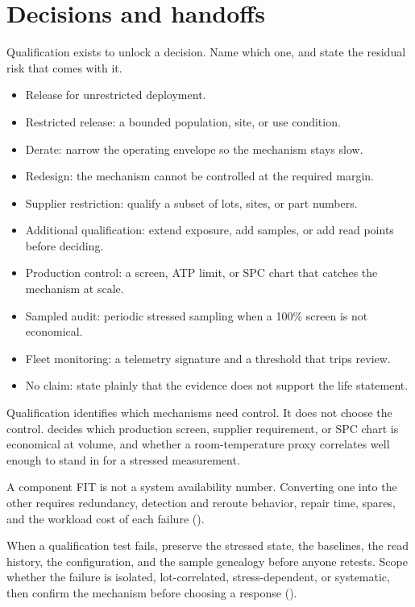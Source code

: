 \section{Decisions and handoffs}
\label{sec:qual-handoffs}

Qualification exists to unlock a decision. Name which one, and state the
residual risk that comes with it.

\begin{itemize}
\item Release for unrestricted deployment.
\item Restricted release: a bounded population, site, or use condition.
\item Derate: narrow the operating envelope so the mechanism stays slow.
\item Redesign: the mechanism cannot be controlled at the required margin.
\item Supplier restriction: qualify a subset of lots, sites, or part numbers.
\item Additional qualification: extend exposure, add samples, or add read
      points before deciding.
\item Production control: a screen, ATP limit, or SPC chart that catches the
      mechanism at scale.
\item Sampled audit: periodic stressed sampling when a 100\% screen is not
      economical.
\item Fleet monitoring: a telemetry signature and a threshold that trips
      review.
\item No claim: state plainly that the evidence does not support the life
      statement.
\end{itemize}

Qualification identifies which mechanisms need control. It does not choose the
control.  decides which production screen, supplier
requirement, or SPC chart is economical at volume, and whether a
room-temperature proxy correlates well enough to stand in for a stressed
measurement.

A component FIT is not a system availability number. Converting one into the
other requires redundancy, detection and reroute behavior, repair time, spares,
and the workload cost of each failure
().

When a qualification test fails, preserve the stressed state, the baselines,
the read history, the configuration, and the sample genealogy before anyone
retests. Scope whether the failure is isolated, lot-correlated,
stress-dependent, or systematic, then confirm the mechanism before choosing a
response ().

